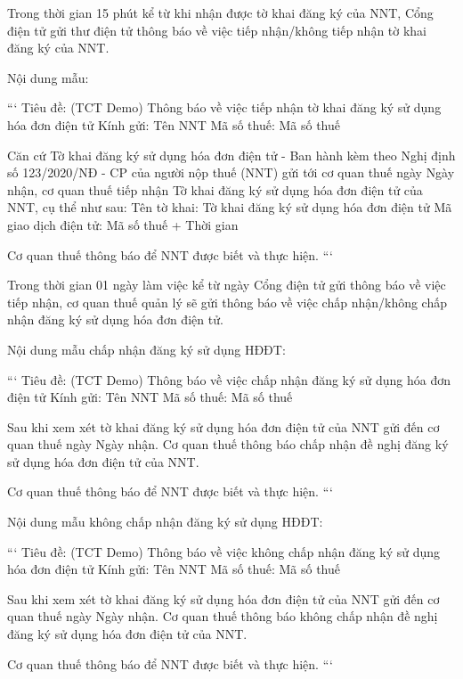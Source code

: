 

Trong thời gian 15 phút kể từ khi nhận được tờ khai đăng ký của NNT, Cổng điện tử gửi thư điện tử thông báo về việc tiếp nhận/không tiếp nhận tờ khai đăng ký của NNT.

Nội dung mẫu:

```
Tiêu đề: (TCT Demo) Thông báo về việc tiếp nhận tờ khai đăng ký sử dụng hóa đơn điện tử
Kính gửi: {{Tên NNT}}
Mã số thuế: {{Mã số thuế}}

Căn cứ Tờ khai đăng ký sử dụng hóa đơn điện tử - Ban hành kèm theo Nghị định số 123/2020/NĐ - CP của người nộp thuế (NNT) gửi tới cơ quan thuế ngày {{Ngày nhận}}, cơ quan thuế tiếp nhận Tờ khai đăng ký sử dụng hóa đơn điện tử của NNT, cụ thể như sau:
Tên tờ khai: Tờ khai đăng ký sử dụng hóa đơn điện tử
Mã giao dịch điện tử: {{Mã số thuế + Thời gian}}

Cơ quan thuế thông báo để NNT được biết và thực hiện.
```


Trong thời gian 01 ngày làm việc kể từ ngày Cổng điện tử gửi thông báo về việc tiếp nhận, cơ quan thuế quản lý sẽ gửi thông báo về việc chấp nhận/không chấp nhận đăng ký sử dụng hóa đơn điện tử.

Nội dung mẫu chấp nhận đăng ký sử dụng HĐĐT:

```
Tiêu đề: (TCT Demo) Thông báo về việc chấp nhận đăng ký sử dụng hóa đơn điện tử
Kính gửi: {{Tên NNT}}
Mã số thuế: {{Mã số thuế}}

Sau khi xem xét tờ khai đăng ký sử dụng hóa đơn điện tử của NNT gửi đến cơ quan thuế ngày {{Ngày nhận}}.
Cơ quan thuế thông báo chấp nhận đề nghị đăng ký sử dụng hóa đơn điện tử của NNT.

Cơ quan thuế thông báo để NNT được biết và thực hiện.
```

Nội dung mẫu không chấp nhận đăng ký sử dụng HĐĐT:

```
Tiêu đề: (TCT Demo) Thông báo về việc không chấp nhận đăng ký sử dụng hóa đơn điện tử
Kính gửi: {{Tên NNT}}
Mã số thuế: {{Mã số thuế}}

Sau khi xem xét tờ khai đăng ký sử dụng hóa đơn điện tử của NNT gửi đến cơ quan thuế ngày {{Ngày nhận}}.
Cơ quan thuế thông báo không chấp nhận đề nghị đăng ký sử dụng hóa đơn điện tử của NNT.

Cơ quan thuế thông báo để NNT được biết và thực hiện.
```

